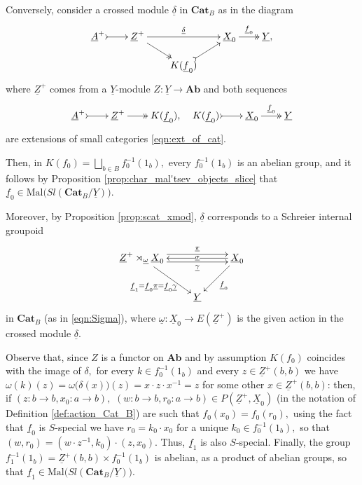 \documentclass[11pt]{amsart}
\theoremstyle{plain}
\theoremstyle{definition}
\theoremstyle{remark}
\newcommand{\un}{\underline}
\begin{document}
Conversely, consider a crossed module $\un{\delta}$ in $\mathbf{Cat}_B$ as in the diagram
\begin{equation*}
\xymatrixrowsep{1pc}
\xymatrixcolsep{1.7pc}
\xymatrix{{\un{A}^+} \ar@{>->}[r] &{\un{Z}^+} \ar@{->>}[rd] \ar[rr]^-{\un{\delta}} &\ &{\un{X}_0} \ar@{->>}[r]^-{\un{f}_0} &{\un{Y},} \\
&\ &{K(\un{f}_0)} \ar@{>->}[ru] &\ &\
}
\end{equation*}
where $\un{Z}^+$ comes from a $\un{Y}$-module $Z\colon \un{Y}\longrightarrow\mathbf{Ab}$ and both sequences
\begin{equation*}
\begin{aligned}
\xymatrixcolsep{1.7pc}\xymatrix{{\un{A}^+} \ar@{>->}[r] &{\un{Z}^+} \ar@{->>}[r] &{K(\un{f}_0),}} \ \  \xymatrixcolsep{1.7pc}\xymatrix{{K(\un{f}_0)} \ar@{>->}[r] &{\un{X}_0} \ar@{->>}[r]^-{\un{f}_0} &{\un{Y}}}
\end{aligned}
\end{equation*}
are extensions of small categories \eqref{eqn:ext_of_cat}.

Then, in $K(f_0)=\bigsqcup_{b\in B}f_0^{-1}(1_b),$ every $f_0^{-1}(1_b)$ is an abelian group, and it follows by Proposition \ref{prop:char_mal'tsev_objects_slice} that $\un{f}_0\in\mathrm{Mal}\big(Sl(\mathbf{Cat}_B/\un{Y})\big).$

Moreover, by Proposition \ref{prop:scat_xmod}, $\un{\delta}$ corresponds to a Schreier internal groupoid
\begin{equation*}
\xymatrix{
{\un{Z}^+\rtimes_{\un{\omega}}\un{X}_0} \ar[rd]_-{\un{f}_1=\un{f}_0\un{\pi}=\un{f}_0\un{\gamma}} \ar@<.9ex>[rr]^-{\un{\pi}} \ar@<-.9ex>[rr]_-{\un{\gamma}} &\ &{\un{X}_0} \ar[ll]|-{\un{\sigma}} \ar[ld]^-{\un{f}_0} \\
&{\un{Y}}
}
\end{equation*}
in $\mathbf{Cat}_B$ (as in \eqref{eqn:Sigma}), where $\un{\omega}\colon\un{X}_0\longrightarrow E(\un{Z}^+)$ is the given action in the crossed module $\un{\delta}.$

Observe that, since $Z$ is a functor on $\mathbf{Ab}$ and by assumption $K(f_0)$ coincides with the image of $\delta,$ for every $k\in f_0^{-1}(1_b)$ and every $z\in \un{Z}^+(b,b)$ we have $\omega(k)(z)=\omega\big(\delta(x)\big)(z)=x\cdot z\cdot x^{-1}=z$ for some other $x\in \un{Z}^+(b,b)$: then, if $(z\colon b\rightarrow b,x_0\colon a\rightarrow b),$ $(w\colon b\rightarrow b,r_0\colon a\rightarrow b)\in P(\un{Z}^+,\un{X}_0)$ (in the notation of Definition \ref{def:action_Cat_B}) are such that $f_0(x_0)=f_0(r_0),$ using the fact that $\un{f}_0$ is $S$-special we have $r_0=k_0\cdot x_0$ for a unique $k_0\in f_0^{-1}(1_b),$ so that $(w,r_0)=(w\cdot z^{-1},k_0)\cdot(z,x_0).$ Thus, $\un{f}_1$ is also $S$-special. Finally, the group $f_1^{-1}(1_b)=\un{Z}^+(b,b)\times f_0^{-1}(1_b)$ is abelian, as a product of abelian groups, so that $\un{f}_1\in\mathrm{Mal}\big(Sl(\mathbf{Cat}_B/\un{Y})\big).$
\end{document}
